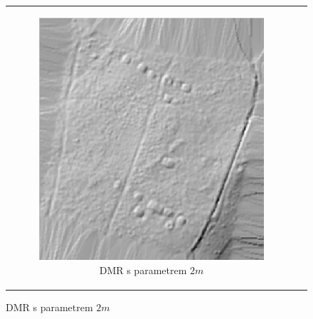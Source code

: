 \begin{figure}[H]
\begin{tabular}{cc}
\begin{subfigure}[b]{0.35\textwidth}
            \includegraphics[width=\textwidth]{images/IM_2m.png}
            \caption{DMR s parametrem $2 m$}
        \end{subfigure} \\


\end{tabular}
\end{figure}
